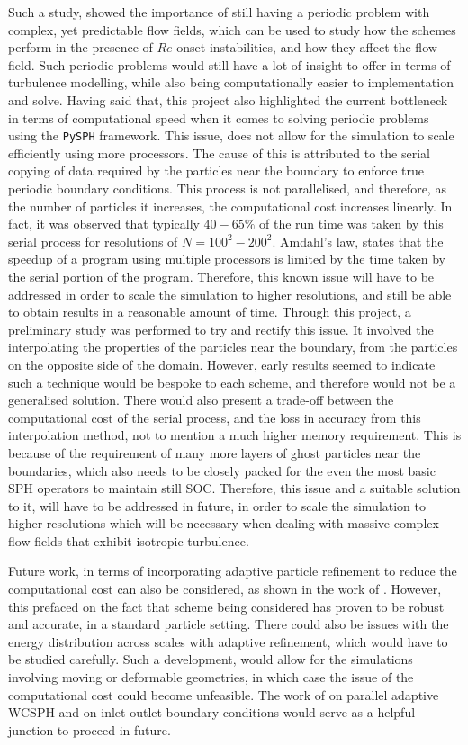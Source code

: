 Such a study, showed the importance of still having a periodic problem with complex, yet predictable flow fields, which can be used to study how the schemes perform in the presence of $Re$-onset instabilities, and how they affect the flow field. Such periodic problems would still have a lot of insight to offer in terms of turbulence modelling, while also being computationally easier to implementation and solve.
Having said that, this project also highlighted the current bottleneck in terms of computational speed when it comes to solving periodic problems using the \texttt{PySPH} framework. This issue, does not allow for the simulation to scale efficiently using more processors. The cause of this is attributed to the serial copying of data required by the particles near the boundary to enforce true periodic boundary conditions. This process is not parallelised, and therefore, as the number of particles it increases, the computational cost increases linearly. In fact, it was observed that typically $40-65\%$ of the run time was taken by this serial process for resolutions of $N = 100^2-200^2$. Amdahl's law, states that the speedup of a program using multiple processors is limited by the time taken by the serial portion of the program. Therefore, this known issue will have to be addressed in order to scale the simulation to higher resolutions, and still be able to obtain results in a reasonable amount of time.
Through this project, a preliminary study was performed to try and rectify this issue. It involved the interpolating the properties of the particles near the boundary, from the particles on the opposite side of the domain. However, early results seemed to indicate such a technique would be bespoke to each scheme, and therefore would not be a generalised solution. There would also present a trade-off between the computational cost of the serial process, and the loss in accuracy from this interpolation method, not to mention a much higher memory requirement. This is because of the requirement of many more layers of ghost particles near the boundaries, which also needs to be closely packed for the even the most basic SPH operators to maintain still SOC.
Therefore, this issue and a suitable solution to it, will have to be addressed in future, in order to scale the simulation to higher resolutions which will be necessary when dealing with massive complex flow fields that exhibit isotropic turbulence.

Future work, in terms of incorporating adaptive particle refinement to reduce the computational cost can also be considered, as shown in the work of \cite{Muta2022}.
However, this prefaced on the fact that scheme being considered has proven to be robust and accurate, in a standard particle setting. There could also be issues with the energy distribution across scales with adaptive refinement, which would have to be studied carefully.
Such a development, would allow for the simulations involving moving or deformable geometries, in which case the issue of the computational cost could become unfeasible. 
The work of \cite{Haftu2022} on parallel adaptive WCSPH and \cite{negi2020improved} on inlet-outlet boundary conditions would serve as a helpful junction to proceed in future.

